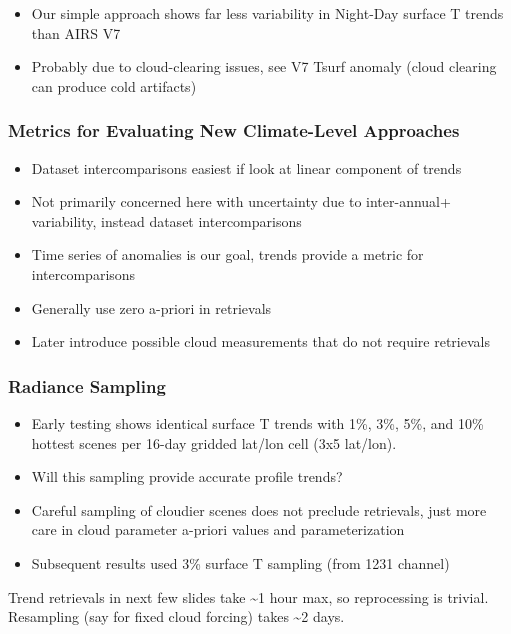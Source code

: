 \documentclass[10pt,t]{beamer}
\begin{document}
\begin{frame}
\begin{itemize}
\item Our simple approach shows far less variability in Night-Day surface T trends than AIRS V7
\item Probably due to cloud-clearing issues, see V7 Tsurf anomaly (cloud clearing can produce cold artifacts)
\end{itemize}
\end{frame}
\begin{frame}
  \frametitle{Metrics for Evaluating New Climate-Level Approaches}
  \begin{itemize}
  \item Dataset intercomparisons easiest if look at linear component of trends
  \item Not primarily concerned here with uncertainty due to inter-annual+ variability, instead dataset intercomparisons
  \item Time series of anomalies is our goal, trends provide a metric for intercomparisons
  \item Generally use zero a-priori in retrievals
  \item Later introduce possible cloud measurements that do not require retrievals
  \end{itemize}
\end{frame}
\begin{frame}
\frametitle{Radiance Sampling}  
\begin{itemize}
\item Early testing shows identical surface T trends with 1\%, 3\%, 5\%, and 10\% hottest scenes per 16-day gridded lat/lon cell (3x5 lat/lon).
\item Will this sampling provide accurate profile trends?
\item Careful sampling of cloudier scenes does not preclude retrievals, just more care in cloud parameter a-priori values and parameterization
\item Subsequent results used 3\% surface T sampling (from 1231 \wn channel)

\vspace{0.1in}
\end{itemize}

Trend retrievals in next few slides take \textasciitilde{}1 hour max, so reprocessing is trivial.\\
  \vspace{0.1in}
Resampling (say for fixed cloud forcing) takes \textasciitilde{}2 days.  
\end{frame}
\end{document}
